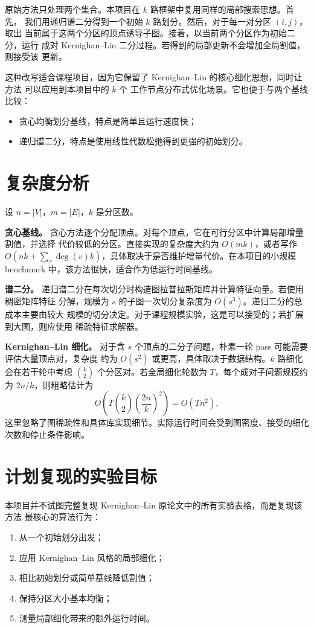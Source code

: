 \documentclass[UTF8, 11pt]{ctexart}
\begin{document}
原始方法只处理两个集合。本项目在 $k$ 路框架中复用同样的局部搜索思想。首先，
我们用递归谱二分得到一个初始 $k$ 路划分。然后，对于每一对分区 $(i,j)$，取出
当前属于这两个分区的顶点诱导子图。接着，以当前两个分区作为初始二分，运行
成对 Kernighan--Lin 二分过程。若得到的局部更新不会增加全局割值，则接受该
更新。

这种改写适合课程项目，因为它保留了 Kernighan--Lin 的核心细化思想，同时让方法
可以应用到本项目中的 $k$ 个 工作节点分布式优化场景。它也便于与两个基线比较：
\begin{itemize}
    \item 贪心均衡划分基线，特点是简单且运行速度快；
    \item 递归谱二分，特点是使用线性代数松弛得到更强的初始划分。
\end{itemize}

\section{复杂度分析}

设 $n=|V|$，$m=|E|$，$k$ 是分区数。

\textbf{贪心基线。}
贪心方法逐个分配顶点。对每个顶点，它在可行分区中计算局部增量割值，并选择
代价较低的分区。直接实现的复杂度大约为 $O(mk)$，或者写作
$O(nk+\sum_v \deg(v)k)$，具体取决于是否维护增量代价。在本项目的小规模
benchmark 中，该方法很快，适合作为低运行时间基线。

\textbf{谱二分。}
递归谱二分在每次切分时构造图拉普拉斯矩阵并计算特征向量。若使用稠密矩阵特征
分解，规模为 $s$ 的子图一次切分复杂度为 $O(s^3)$。递归二分的总成本主要由较大
规模的切分决定。对于课程规模实验，这是可以接受的；若扩展到大图，则应使用
稀疏特征求解器。

\textbf{Kernighan--Lin 细化。}
对于含 $s$ 个顶点的二分子问题，朴素一轮 pass 可能需要评估大量顶点对，复杂度
约为 $O(s^2)$ 或更高，具体取决于数据结构。$k$ 路细化会在若干轮中考虑
$\binom{k}{2}$ 个分区对。若全局细化轮数为 $T$，每个成对子问题规模约为
$2n/k$，则粗略估计为
\[
    O\left(T \binom{k}{2}\left(\frac{2n}{k}\right)^2\right)
    =
    O(Tn^2),
\]
这里忽略了图稀疏性和具体库实现细节。实际运行时间会受到图密度、接受的细化
次数和停止条件影响。

\section{计划复现的实验目标}

本项目并不试图完整复现 Kernighan--Lin 原论文中的所有实验表格，而是复现该方法
最核心的算法行为：
\begin{enumerate}
    \item 从一个初始划分出发；
    \item 应用 Kernighan--Lin 风格的局部细化；
    \item 相比初始划分或简单基线降低割值；
    \item 保持分区大小基本均衡；
    \item 测量局部细化带来的额外运行时间。
\end{enumerate}
\end{document}
